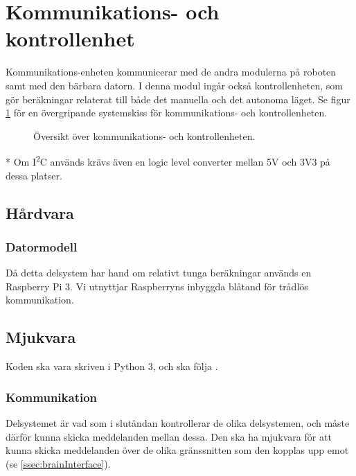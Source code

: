 \documentclass[a4paper,11pt]{article}
\begin{document}
\section{Kommunikations- och kontrollenhet} \label{sec:system3}
Kommunikations-enheten kommunicerar med de andra modulerna på roboten samt med den bärbara datorn. I denna modul ingår också kontrollenheten, som gör beräkningar relaterat till både det manuella och det autonoma läget. Se figur \ref{fig:unitBrain} för en övergripande systemskiss för kommunikations- och kontrollenheten.
\begin{figure}[h!]
    \caption{Översikt över kommunikations- och kontrollenheten.  }
    \label{fig:unitBrain}
\end{figure}
\noindent \begin{small}
* Om I\textsuperscript{2}C används krävs även en logic level converter mellan 5V och 3V3 på dessa platser.
\end{small}


\subsection{Hårdvara}

\subsubsection{Datormodell}
Då detta delsystem har hand om relativt tunga beräkningar används en Raspberry Pi 3. Vi utnyttjar Raspberryns inbyggda blåtand för trådlös kommunikation.

\subsection{Mjukvara}
Koden ska vara skriven i Python 3, och ska följa \cite{pep8}.

\subsubsection{Kommunikation}
Delsystemet är vad som i slutändan kontrollerar de olika delsystemen, och måste därför kunna skicka meddelanden mellan dessa. Den ska ha mjukvara för att kunna skicka meddelanden över de olika gränssnitten som den kopplas upp emot (se \ref{ssec:brainInterface}).
\end{document}
